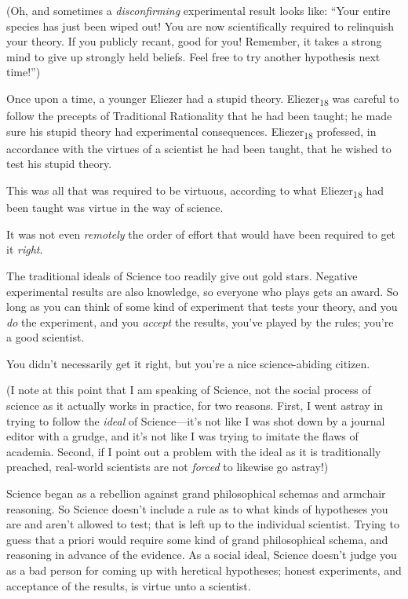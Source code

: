{
 (Oh, and sometimes a \textit{disconfirming} experimental result
looks like: ``Your entire species has just been wiped
out! You are now scientifically required to relinquish your theory. If
you publicly recant, good for you! Remember, it takes a strong mind to
give up strongly held beliefs. Feel free to try another hypothesis next
time!'')}

\myendsectiontext


\bigskip


{
 Once upon a time, a younger Eliezer had a stupid theory.
Eliezer\textsubscript{18} was careful to follow the precepts of
Traditional Rationality that he had been taught; he made sure his
stupid theory had experimental consequences. Eliezer\textsubscript{18}
professed, in accordance with the virtues of a scientist he had been
taught, that he wished to test his stupid theory. }

{
 This was all that was required to be virtuous, according to what
Eliezer\textsubscript{18} had been taught was virtue in the way of
science.}

{
 It was not even \textit{remotely} the order of effort that would
have been required to get it \textit{right}.}

{
 The traditional ideals of Science too readily give out gold stars.
Negative experimental results are also knowledge, so everyone who plays
gets an award. So long as you can think of some kind of experiment that
tests your theory, and you \textit{do} the experiment, and you
\textit{accept} the results, you've played by the
rules; you're a good scientist.}

{
 You didn't necessarily get it right, but
you're a nice science-abiding citizen.}

{
 (I note at this point that I am speaking of Science, not the
social process of science as it actually works in practice, for two
reasons. First, I went astray in trying to follow the \textit{ideal} of
Science---it's not like I was shot down by a journal
editor with a grudge, and it's not like I was trying to
imitate the flaws of academia. Second, if I point out a problem with
the ideal as it is traditionally preached, real-world scientists are
not \textit{forced} to likewise go astray!)}

{
 Science began as a rebellion against grand philosophical schemas
and armchair reasoning. So Science doesn't include a
rule as to what kinds of hypotheses you are and aren't
allowed to test; that is left up to the individual scientist. Trying to
guess that a priori would require some kind of grand philosophical
schema, and reasoning in advance of the evidence. As a social ideal,
Science doesn't judge you as a bad person for coming up
with heretical hypotheses; honest experiments, and acceptance of the
results, is virtue unto a scientist.}

